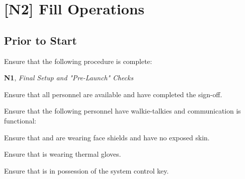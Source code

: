 \section{[N2] Fill Operations} 
\subsection{Prior to Start}
\begin{checklist}
    \item Ensure that the following procedure is complete:
    \begin{checklist}
        \item \textbf{N1}, \textit{Final Setup and "Pre-Launch" Checks}
    \end{checklist}
    \item Ensure that all personnel are available and have completed the sign-off.
    \item Ensure that the following personnel have walkie-talkies and communication is functional:
    \begin{checklist}
        \item \ops{}
        \item \control{}
        \item \primary{}
        \item \secondary{}
    \end{checklist}
    \item Ensure that \primary{} and \secondary{} are wearing face shields and have no exposed skin.
    \item Ensure that \primary{} is wearing thermal gloves.
    \item Ensure that \ops{} is in possession of the system control key.
\end{checklist}
\setcounter{checklistnum}{0}

